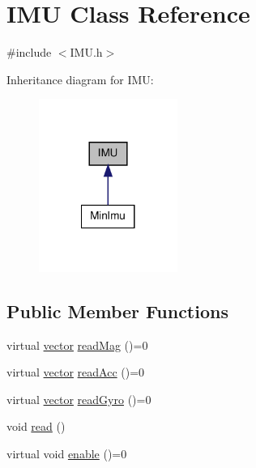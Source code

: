 \hypertarget{class_i_m_u}{\section{\-I\-M\-U \-Class \-Reference}
\label{class_i_m_u}
}


{\ttfamily \#include $<$\-I\-M\-U.\-h$>$}



\-Inheritance diagram for \-I\-M\-U\-:\nopagebreak
\begin{figure}[H]
\begin{center}
\leavevmode
\includegraphics[width=128pt]{class_i_m_u__inherit__graph}
\end{center}
\end{figure}
\subsection*{\-Public \-Member \-Functions}
\begin{DoxyCompactItemize}
\item 
virtual \hyperlink{vector_8h_a148efcf3c5319dd8961dbf9f4b846a98}{vector} \hyperlink{class_i_m_u_a52359006a1ca04d0b1852f374a476f91}{read\-Mag} ()=0
\item 
virtual \hyperlink{vector_8h_a148efcf3c5319dd8961dbf9f4b846a98}{vector} \hyperlink{class_i_m_u_a2928cc8a1fc13464ef90da96fd9358b7}{read\-Acc} ()=0
\item 
virtual \hyperlink{vector_8h_a148efcf3c5319dd8961dbf9f4b846a98}{vector} \hyperlink{class_i_m_u_a887a00b7e1c998a65ee42b021b59d84c}{read\-Gyro} ()=0
\item 
void \hyperlink{class_i_m_u_a1de4cb31f28f71d7cc8b1546ea59b4ab}{read} ()
\item 
virtual void \hyperlink{class_i_m_u_a58899f2357a00a4d1f3b892b879e1e92}{enable} ()=0
\end{DoxyCompactItemize}
